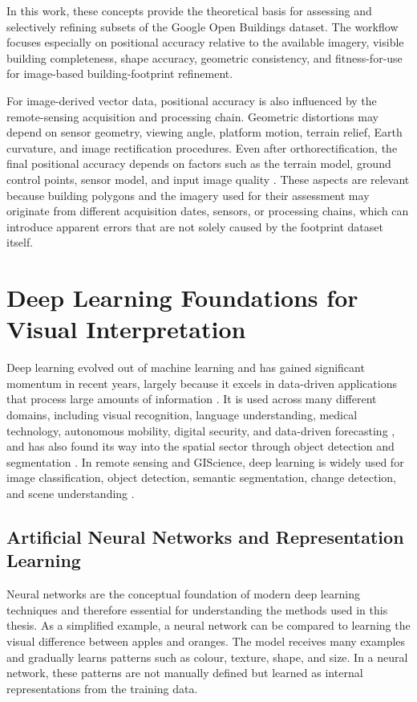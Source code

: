 In this work, these concepts provide the theoretical basis for assessing and selectively refining subsets of the Google Open Buildings dataset. The workflow focuses especially on positional accuracy relative to the available imagery, visible building completeness, shape accuracy, geometric consistency, and fitness-for-use for image-based building-footprint refinement.

For image-derived vector data, positional accuracy is also influenced by the remote-sensing acquisition and processing chain. Geometric distortions may depend on sensor geometry, viewing angle, platform motion, terrain relief, Earth curvature, and image rectification procedures. Even after orthorectification, the final positional accuracy depends on factors such as the terrain model, ground control points, sensor model, and input image quality \citep{Toutin01052004}. These aspects are relevant because building polygons and the imagery used for their assessment may originate from different acquisition dates, sensors, or processing chains, which can introduce apparent errors that are not solely caused by the footprint dataset itself.

\section{Deep Learning Foundations for Visual Interpretation}
\label{sec:deep_learning_foundations}
Deep learning evolved out of machine learning and has gained significant momentum in recent years, largely because it excels in data-driven applications that process large amounts of information \citep{Zhu2017DeepRemote}. It is used across many different domains, including visual recognition, language understanding, medical technology, autonomous mobility, digital security, and data-driven forecasting \citep{shiri2023comprehensive}, and has also found its way into the spatial sector through object detection and segmentation \citep{Zhu2017DeepRemote}. In remote sensing and GIScience, deep learning is widely used for image classification, object detection, semantic segmentation, change detection, and scene understanding \citep{Zhu2017DeepRemote}.
\subsection{Artificial Neural Networks and Representation Learning}
\label{sec:ann_representation_learning}

Neural networks are the conceptual foundation of modern deep learning techniques and therefore essential for understanding the methods used in this thesis. As a simplified example, a neural network can be compared to learning the visual difference between apples and oranges. The model receives many examples and gradually learns patterns such as colour, texture, shape, and size. In a neural network, these patterns are not manually defined but learned as internal representations from the training data.

